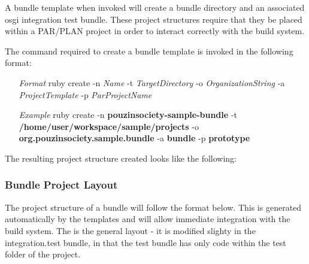 A bundle template when invoked will create a bundle directory and an associated osgi
integration test bundle. These project structures require that they be placed within
a PAR/PLAN project in order to interact correctly with the build system.

The command required to create a bundle template is invoked in the following format:

\begin{enumerate}
\item[\emph{Format}] ruby create -n \emph{Name} -t \emph{TargetDirectory} -o \emph{ OrganizationString} -a \emph{ProjectTemplate} -p \emph{ParProjectName}
\item[\emph{Example}] ruby create -n \textbf{pouzinsociety-sample-bundle} -t \textbf{/home/user/workspace/sample/projects} -o \textbf{org.pouzinsociety.sample.bundle} -a \textbf{bundle} -p \textbf{prototype}
\end{enumerate}

The resulting project structure created looks like the following:

\begin{figure}[H]

\end{figure}

\subsubsection{Bundle Project Layout}
The project structure of a bundle will follow the format below. This is generated automatically
by the templates and will allow immediate integration with the build system. The is the general
layout - it is modified slighty in the integration.test bundle, in that the test bundle has only
code within the test folder of the project.

